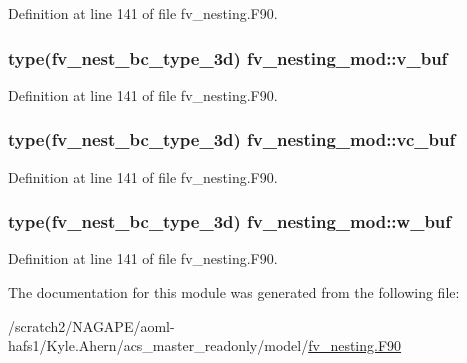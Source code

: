 Definition at line 141 of file fv\-\_\-nesting.\-F90.

\subsubsection[{v\-\_\-buf}]{\setlength{\rightskip}{0pt plus 5cm}type(fv\-\_\-nest\-\_\-bc\-\_\-type\-\_\-3d) fv\-\_\-nesting\-\_\-mod\-::v\-\_\-buf}\label{classfv__nesting__mod_a477f9eccd84b2121d316306990d4c277}


Definition at line 141 of file fv\-\_\-nesting.\-F90.

\subsubsection[{vc\-\_\-buf}]{\setlength{\rightskip}{0pt plus 5cm}type(fv\-\_\-nest\-\_\-bc\-\_\-type\-\_\-3d) fv\-\_\-nesting\-\_\-mod\-::vc\-\_\-buf}\label{classfv__nesting__mod_ad04b4ce86437a1860b2c7f577af68f2c}


Definition at line 141 of file fv\-\_\-nesting.\-F90.

\subsubsection[{w\-\_\-buf}]{\setlength{\rightskip}{0pt plus 5cm}type(fv\-\_\-nest\-\_\-bc\-\_\-type\-\_\-3d) fv\-\_\-nesting\-\_\-mod\-::w\-\_\-buf}\label{classfv__nesting__mod_a41d3f0c81bc4af38520dd7eab1469baf}


Definition at line 141 of file fv\-\_\-nesting.\-F90.



The documentation for this module was generated from the following file\-:\begin{DoxyCompactItemize}
\item 
/scratch2/\-N\-A\-G\-A\-P\-E/aoml-\/hafs1/\-Kyle.\-Ahern/acs\-\_\-master\-\_\-readonly/model/\hyperlink{fv__nesting_8F90}{fv\-\_\-nesting.\-F90}\end{DoxyCompactItemize}

